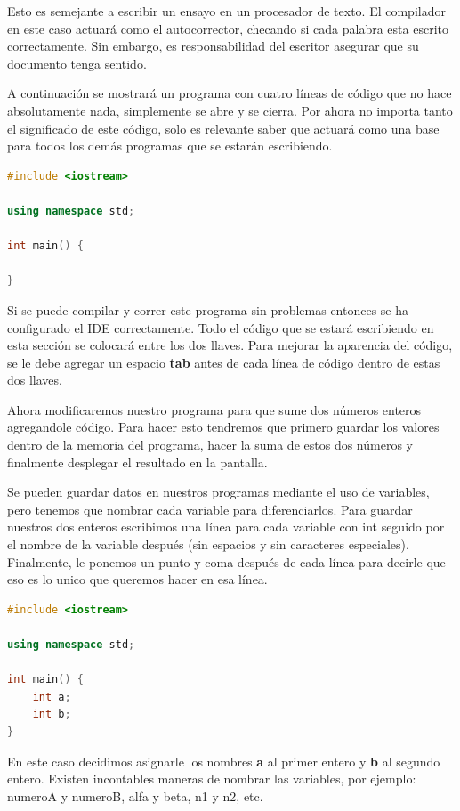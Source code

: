 \documentclass{article}
\begin{document}
Esto es semejante a escribir un ensayo en un procesador de texto. El compilador en este caso actuará como el autocorrector, checando si cada palabra esta escrito correctamente. Sin embargo, es responsabilidad del escritor asegurar que su documento tenga sentido.

A continuación se mostrará un programa con cuatro líneas de código que no hace absolutamente nada, simplemente se abre y se cierra. Por ahora no importa tanto el significado de este código, solo es relevante saber que actuará como una base para todos los demás programas que se estarán escribiendo.

\begin{lstlisting}[language=C++, title=Las cuatro líneas esenciales]
#include <iostream>

using namespace std;

int main() {

}
\end{lstlisting}

Si se puede compilar y correr este programa sin problemas entonces se ha configurado el IDE correctamente. Todo el código que se estará escribiendo en esta sección se colocará entre los dos llaves. Para mejorar la aparencia del código, se le debe agregar un espacio \textbf{tab} antes de cada línea de código dentro de estas dos llaves.

Ahora modificaremos nuestro programa para que sume dos números enteros agregandole código. Para hacer esto tendremos que primero guardar los valores dentro de la memoria del programa, hacer la suma de estos dos números y finalmente desplegar el resultado en la pantalla.

Se pueden guardar datos en nuestros programas mediante el uso de variables, pero tenemos que nombrar cada variable para diferenciarlos. Para guardar nuestros dos enteros escribimos una línea para cada variable con int seguido por el nombre de la variable después (sin espacios y sin caracteres especiales). Finalmente, le ponemos un punto y coma después de cada línea para decirle que eso es lo unico que queremos hacer en esa línea.

\begin{lstlisting}[language=C++, title=Dos variables]
#include <iostream>

using namespace std;

int main() {
	int a;
	int b;
}
\end{lstlisting}

En este caso decidimos asignarle los nombres \textbf{a} al primer entero y \textbf{b} al segundo entero. Existen incontables maneras de nombrar las variables, por ejemplo: numeroA y numeroB, alfa y beta, n1 y n2, etc.
\end{document}
